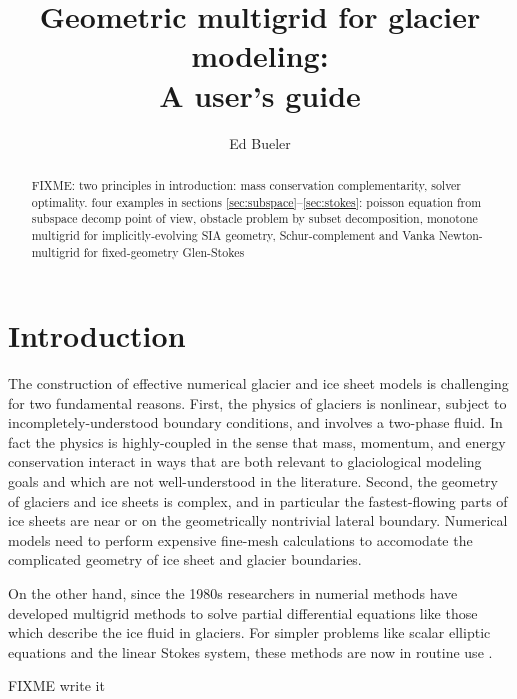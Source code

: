 \documentclass[letterpaper,final,12pt,reqno]{amsart}
\begin{document}
\title[Geometric multigrid for glacier modeling]{Geometric multigrid for glacier modeling: \\ A user's guide}

\author{Ed Bueler}

\begin{abstract} FIXME: two principles in introduction: mass conservation complementarity, solver optimality.  four examples in sections \ref{sec:subspace}--\ref{sec:stokes}: poisson equation from subspace decomp point of view, obstacle problem by subset decomposition, monotone multigrid for implicitly-evolving SIA geometry, Schur-complement and Vanka Newton-multigrid for fixed-geometry Glen-Stokes
\end{abstract}

\maketitle

\thispagestyle{empty}
\bigskip

\section{Introduction} \label{sec:intro}

The construction of effective numerical glacier and ice sheet models is challenging for two fundamental reasons.  First, the physics of glaciers is nonlinear, subject to incompletely-understood boundary conditions, and involves a two-phase fluid.  In fact the physics is highly-coupled in the sense that mass, momentum, and energy conservation interact in ways that are both relevant to glaciological modeling goals and which are not well-understood in the literature.  Second, the geometry of glaciers and ice sheets is complex, and in particular the fastest-flowing parts of ice sheets are near or on the geometrically nontrivial lateral boundary.  Numerical models need to perform expensive fine-mesh calculations to accomodate the complicated geometry of ice sheet and glacier boundaries.

On the other hand, since the 1980s researchers in numerial methods have developed multigrid methods to solve partial differential equations like those which describe the ice fluid in glaciers.   For simpler problems like scalar elliptic equations and the linear Stokes system, these methods are now in routine use \cite{Briggsetal2000,Bueler2021,Trottenbergetal2001}.

FIXME write it
\end{document}
